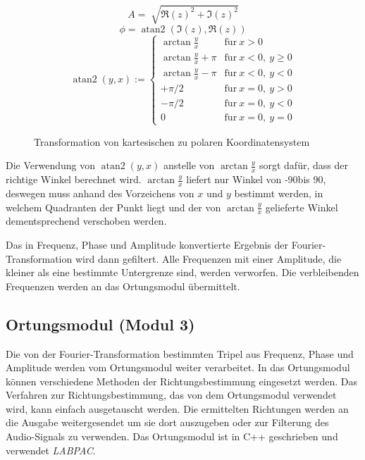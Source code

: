 \begin{minipage}{0.49\textwidth}
  $$
  A = \sqrt[]{{\Re(z)}^2 + {\Im(z)}^2}
  $$
  $$
  \phi = \operatorname{atan2}(\Im(z), \Re(z))
  $$
  $$
  \operatorname{atan2}(y,x) := \begin{cases} \arctan\frac{y}{x} & \mathrm{f\ddot ur}\ x > 0\\ \arctan\frac{y}{x} + \pi & \mathrm{f\ddot ur}\ x < 0,\ y \geq 0\\ \arctan\frac{y}{x} - \pi & \mathrm{f\ddot ur}\ x < 0,\ y < 0\\ +\pi/2 & \mathrm{f\ddot ur}\ x = 0,\ y > 0\\ -\pi/2 & \mathrm{f\ddot ur}\ x = 0,\ y < 0\\ 0 & \mathrm{f\ddot ur}\ x = 0,\ y = 0 \end{cases}
  $$
\end{minipage}
\begin{minipage}{0.49\textwidth}
  \begin{figure}[H]
    \centering
    \scalebox{.6}{}
    \caption{Transformation von kartesischen zu polaren Koordinatensystem}
    \label{fig:polarconvert}
  \end{figure}
\end{minipage}
Die Verwendung von $\operatorname{atan2}(y,x)$ anstelle von $\arctan\frac{y}{x}$ sorgt dafür, dass der richtige Winkel berechnet wird. $\arctan\frac{y}{x}$ liefert nur Winkel von -90\degree bis 90\degree, deswegen muss anhand des Vorzeichens von $x$ und $y$ bestimmt werden, in welchem Quadranten der Punkt liegt und der von $\arctan\frac{y}{x}$ gelieferte Winkel dementsprechend verschoben werden.

Das in Frequenz, Phase und Amplitude konvertierte Ergebnis der Fourier-Transformation wird dann gefiltert. Alle Frequenzen mit einer Amplitude, die kleiner als eine bestimmte Untergrenze sind, werden verworfen. Die verbleibenden Frequenzen werden an das Ortungsmodul übermittelt.

\subsection{Ortungsmodul (Modul 3)}
Die von der Fourier-Transformation bestimmten Tripel aus Frequenz, Phase und Amplitude werden vom Ortungsmodul weiter verarbeitet. In das Ortungsmodul können verschiedene Methoden der Richtungsbestimmung eingesetzt werden. Das Verfahren zur Richtungsbestimmung, das von dem Ortungsmodul verwendet wird, kann einfach ausgetauscht werden. Die ermittelten Richtungen werden an die Ausgabe weitergesendet um sie dort auszugeben oder zur Filterung des Audio-Signals zu verwenden.
Das Ortungsmodul ist in C++ geschrieben und verwendet \textit{LABPAC}.
